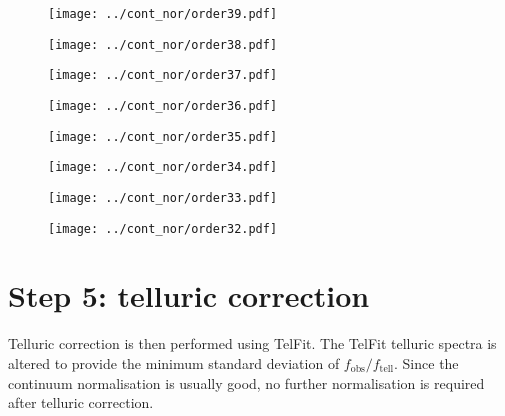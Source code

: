 \documentclass{article}
\begin{document}
\begin{figure}[H]
    \centering
    \texttt{[image: ../cont\_nor/order39.pdf]}
\end{figure}
\begin{figure}[H]
    \centering
    \texttt{[image: ../cont\_nor/order38.pdf]}
\end{figure}
\begin{figure}[H]
    \centering
    \texttt{[image: ../cont\_nor/order37.pdf]}
\end{figure}
\begin{figure}[H]
    \centering
    \texttt{[image: ../cont\_nor/order36.pdf]}
\end{figure}
\begin{figure}[H]
    \centering
    \texttt{[image: ../cont\_nor/order35.pdf]}
\end{figure}
\begin{figure}[H]
    \centering
    \texttt{[image: ../cont\_nor/order34.pdf]}
\end{figure}
\begin{figure}[H]
    \centering
    \texttt{[image: ../cont\_nor/order33.pdf]}
\end{figure}
\begin{figure}[H]
    \centering
    \texttt{[image: ../cont\_nor/order32.pdf]}
\end{figure}

\newpage

\section{Step 5: telluric correction}

Telluric correction is then performed using TelFit. 
The TelFit telluric spectra is altered to provide the minimum standard deviation of $f_\mathrm{obs} / f_\mathrm{tell}$.
Since the continuum normalisation is usually good, no further normalisation is required after telluric correction. 
\end{document}
